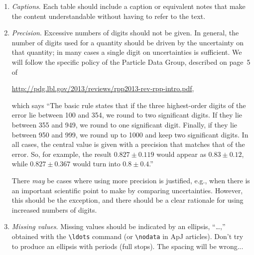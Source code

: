 \documentclass[letterpaper,11pt]{article}
\begin{document}
\begin{enumerate}

\item{\it Captions\/}.  Each table should include a caption or equivalent notes that make the content understandable without having to refer to the text.

\item {\it Precision\/}. Excessive numbers of digits should not be given.  In general, the number
of digits used for a quantity should be driven by the uncertainty on that
quantity; in many cases a
single digit on uncertainties is sufficient.  We will follow the specific
policy of the Particle Data Group, described on page~5 of

\url{http://pdg.lbl.gov/2013/reviews/rpp2013-rev-rpp-intro.pdf},

\noindent which says ``The basic rule states that if the three
highest-order digits of the error lie between 100 and 354, we round to two
significant digits.  If they lie between 355 and 949, we round to one
significant digit.  Finally, if they lie between 950 and 999, we round up to
1000 and keep two significant digits.  In all cases, the central value is given
with a precision that matches that of the error.  So, for example, the result
$0.827\pm0.119$ would appear as $0.83\pm0.12$, while
$0.827\pm0.367$ would turn into $0.8\pm0.4$.''

There {\it may\/} be cases where using more precision is justified, e.g.,
when there is an important scientific point to make by comparing uncertainties.
However, this should be the exception, and there should be a clear rationale
for using increased numbers of digits.

%

\item {\it Missing values\/}. Missing values should be indicated by an ellipsis, ``\dots,'' obtained
with the \verb|\ldots| command (or \verb|\nodata| in ApJ articles).  Don't try to produce an ellipsis with periods (full
stops).  The spacing will be wrong...


\end{enumerate}
\end{document}
